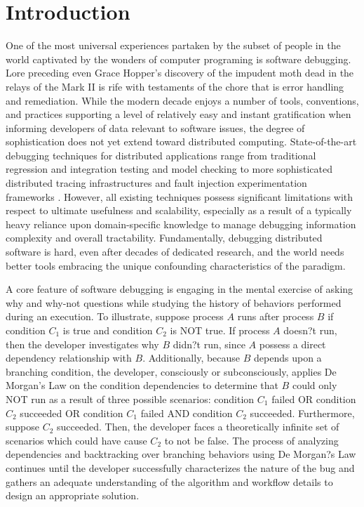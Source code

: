 \section{Introduction} \label{intro}
One of the most universal experiences partaken by the subset of people in the world captivated by the wonders of computer programing is software debugging. Lore preceding even Grace Hopper's discovery of the impudent moth dead in the relays of the Mark II \cite{Kidwell:1998:SEC:612504.612741} is rife with testaments of the chore that is error handling and remediation. While the modern decade enjoys a number of tools, conventions, and practices supporting a level of relatively easy and instant gratification when informing developers of data relevant to software issues, the degree of sophistication does not yet extend toward distributed computing. State-of-the-art debugging techniques for distributed applications range from traditional regression and integration testing and model checking to more sophisticated distributed tracing infrastructures and fault injection experimentation frameworks \cite{36356, 203322, Zave:2012:ULM:2185376.2185383, Chang:2015:CMI:2785956.2790038, Beschastnikh:2016:DDS:2975594.2909480}. However, all existing techniques possess significant limitations with respect to ultimate usefulness and scalability, especially as a result of a typically heavy reliance upon domain-specific knowledge to manage debugging information complexity and overall tractability. Fundamentally, debugging distributed software is hard, even after decades of dedicated research, and the world needs better tools embracing the unique confounding characteristics of the paradigm. 

A core feature of software debugging is engaging in the mental exercise of asking why and why-not questions while studying the history of behaviors performed during an execution. To illustrate, suppose process $A$ runs after process $B$ if condition $C_1$ is true and condition $C_2$ is NOT true. If process $A$ doesn?t run, then the developer investigates why $B$ didn?t run, since $A$ possess a direct dependency relationship with $B$. Additionally, because $B$ depends upon a branching condition, the developer, consciously or subconsciously, applies De Morgan's Law \cite{Epp:2010:DMA:1941983} on the condition dependencies to determine that $B$ could only NOT run as a result of three possible scenarios: condition $C_1$ failed OR condition $C_2$ succeeded OR condition $C_1$ failed AND condition $C_2$ succeeded. Furthermore, suppose $C_2$ succeeded. Then, the developer faces a theoretically infinite set of scenarios which could have cause $C_2$ to not be false. The process of analyzing dependencies and backtracking over branching behaviors using De Morgan?s Law continues until the developer successfully characterizes the nature of the bug and gathers an adequate understanding of the algorithm and workflow details to design an appropriate solution.

